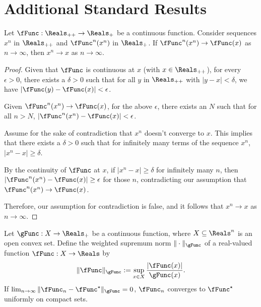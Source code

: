\documentclass[\econtexRoot/BufferStockTheory]{subfiles}
\begin{document}
\section{Additional Standard Results}\label{sec:realanalysis}


\begin{proposition}
Let $\fFunc: \Reals_{++} \to \Reals_{+}$ be a continuous function. Consider sequences $x^{n}$ in $\Reals_{++}$ and $\fFunc^n(x^{n})$ in $\Reals_{+}$. If $\fFunc^{n}(x^{n}) \to \fFunc(x)$ as $n \to \infty$, then $x^{n} \to x$ as $n \to \infty$.
\end{proposition}

\begin{proof}
Given that $\fFunc$ is continuous at $x$ (with $x \in \Reals_{++}$), for every $\epsilon > 0$, there exists a $\delta > 0$ such that for all $y$ in $\Reals_{++}$ with $\vert y - x\vert < \delta$, we have $\vert \fFunc(y) - \fFunc(x)\vert  < \epsilon$.

Given $\fFunc^{n}(x^{n}) \to \fFunc(x)$, for the above $\epsilon$, there exists an $N$ such that for all $n > N$, $\vert \fFunc^{n}(x^{n}) - \fFunc(x)\vert < \epsilon$.

Assume for the sake of contradiction that $x^{n}$ doesn't converge to $x$.
This implies that there exists a $\delta > 0$ such that for infinitely many terms of the sequence $x^{n}$, $\vert x^{n} - x\vert  \geq \delta$.

By the continuity of $\fFunc$ at $x$, if $\vert x^{n} - x\vert  \geq \delta$ for infinitely many $n$, then $\vert \fFunc^{n}(x^{n}) - \fFunc(x)\vert  \geq \epsilon$ for those $n$, contradicting our assumption that $\fFunc^{n}(x^{n}) \to \fFunc(x)$.

Therefore, our assumption for contradiction is false, and it follows that $x^{n} \to x$ as $n \to \infty$.
\end{proof}

\begin{fact}\label{fact:normimpliescompact}
Let $\gFunc: X \to \Reals_{+}$ be a continuous function, where $X \subseteq \Reals^{n}$ is an open convex set. Define the weighted supremum norm $\Vert\cdot \Vert_{\gFunc}$ of a real-valued function $\fFunc: X \to \Reals$ by
\begin{equation}
\Vert \fFunc \Vert_\gFunc := \sup_{x \in X} \frac{\vert \fFunc(x)\vert }{\gFunc(x)}.
\end{equation}
If $\lim_{n \to \infty} \Vert \fFunc_n - \fFunc^{\star} \Vert_\gFunc = 0$, $\fFunc_n$ converges to $\fFunc^{\star}$ uniformly on compact sets.
\end{fact}
\end{document}
